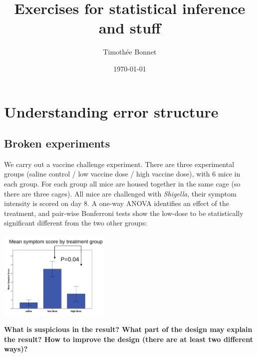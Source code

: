 \documentclass[12pt,a4paper]{scrartcl}\usepackage[]{graphicx}\usepackage[]{color}
\title{Exercises for statistical inference and stuff}
\date{\today}
\author{Timoth\'ee Bonnet}
\begin{document}
\maketitle

\tableofcontents
\ListOfExerciseInToc
{}

\clearpage

\section{Understanding error structure}

\subsection{Broken experiments}

\begin{Exercise}[difficulty=1, title={A significant result?}]
We carry out a vaccine challenge experiment. There are three experimental groups (saline control / low vaccine dose / high vaccine dose), with 6 mice in each group. For each group all mice are housed together in the same cage (so there are three cages). All mice are challenged with \emph{Shigella}, their symptom intensity is scored on day 8. A one-way ANOVA identifies an effect of the treatment, and pair-wise Bonferroni tests show the low-dose to be statistically significant different from the two other groups:

\includegraphics[width=0.4\textwidth]{Figures/message1}

\textbf{What is suspicious in the result? What part of the design may explain the result? How to improve the design (there are at least two different ways)?}
\end{Exercise}
\end{document}

